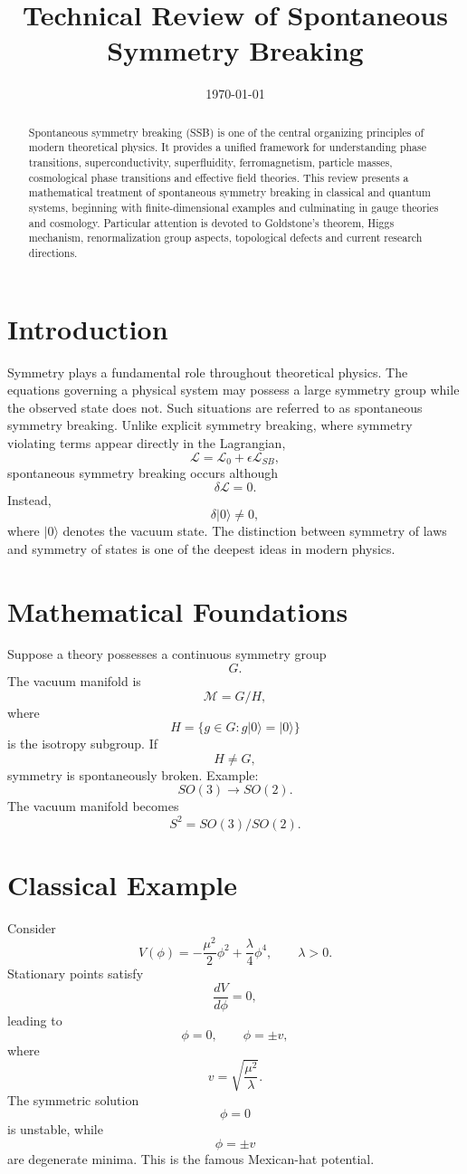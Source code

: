 \documentclass[11pt,a4paper]{article}
\title{\bf Technical Review of Spontaneous Symmetry Breaking}
\author{}
\date{\today}
\begin{document}
\maketitle
\begin{abstract}
Spontaneous symmetry breaking (SSB) is one of the central organizing
principles of modern theoretical physics. It provides a unified framework
for understanding phase transitions, superconductivity, superfluidity,
ferromagnetism, particle masses, cosmological phase transitions and
effective field theories. This review presents a mathematical treatment
of spontaneous symmetry breaking in classical and quantum systems,
beginning with finite-dimensional examples and culminating in gauge
theories and cosmology. Particular attention is devoted to Goldstone's
theorem, Higgs mechanism, renormalization group aspects, topological
defects and current research directions.
\end{abstract}
\tableofcontents
\newpage
\section{Introduction}
Symmetry plays a fundamental role throughout theoretical physics.
The equations governing a physical system may possess a large symmetry
group while the observed state does not. Such situations are referred
to as spontaneous symmetry breaking.
Unlike explicit symmetry breaking, where symmetry violating terms appear
directly in the Lagrangian,
\[
\mathcal{L}
=
\mathcal{L}_0
+
\epsilon \mathcal{L}_{SB},
\]
spontaneous symmetry breaking occurs although
\[
\delta \mathcal{L}=0.
\]
Instead,
\[
\delta |0\rangle \neq 0,
\]
where $|0\rangle$ denotes the vacuum state.
The distinction between symmetry of laws and symmetry of states is one
of the deepest ideas in modern physics.
\section{Mathematical Foundations}
Suppose a theory possesses a continuous symmetry group
\[
G.
\]
The vacuum manifold is
\[
\mathcal{M}
=
G/H,
\]
where
\[
H
=
\{g\in G:
g|0\rangle=|0\rangle\}
\]
is the isotropy subgroup.
If
\[
H\neq G,
\]
symmetry is spontaneously broken.
Example:
\[
SO(3)
\rightarrow
SO(2).
\]
The vacuum manifold becomes
\[
S^2
=
SO(3)/SO(2).
\]
\section{Classical Example}
Consider
\[
V(\phi)
=
-\frac{\mu^2}{2}\phi^2
+
\frac{\lambda}{4}\phi^4,
\qquad
\lambda>0.
\]
Stationary points satisfy
\[
\frac{dV}{d\phi}=0,
\]
leading to
\[
\phi
=
0,
\qquad
\phi
=
\pm
v,
\]
where
\[
v
=
\sqrt{\frac{\mu^2}{\lambda}}.
\]
The symmetric solution
\[
\phi=0
\]
is unstable,
while
\[
\phi=\pm v
\]
are degenerate minima.
This is the famous Mexican-hat potential.
\end{document}
